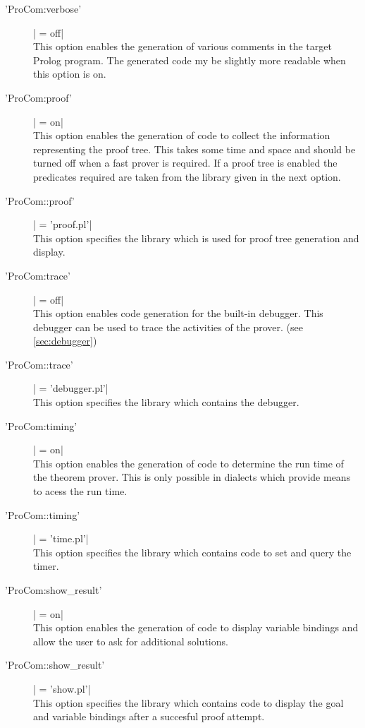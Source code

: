 \begin{description}

  \item ['ProCom:verbose'] | = off|
    \\
    This option enables the generation of various comments in the target
    Prolog program. The generated code my be slightly more readable when this
    option is on.

  \item ['ProCom:proof'] | = on|
    \\
    This option enables the generation of code to collect the information
    representing the proof tree. This takes some time and space and should be
    turned off when a fast prover is required. If a proof tree is enabled the
    predicates required are taken from the library given in the next option.

  \item ['ProCom::proof'] | = 'proof.pl'|
    \\
    This option specifies the library which is used for proof tree generation
    and display.

  \item ['ProCom:trace'	] | = off|
    \\
    This option enables code generation for the built-in debugger. This
    debugger can be used to trace the activities of the prover. (see
    \ref{sec:debugger})

  \item ['ProCom::trace'] | = 'debugger.pl'|
    \\
    This option specifies the library which contains the debugger.

  \item ['ProCom:timing'] | = on|
    \\
    This option enables the generation of code to determine the run time of
    the theorem prover. This is only possible in dialects which provide means
    to acess the run time.

  \item ['ProCom::timing'] | = 'time.pl'|
    \\
    This option specifies the library which contains code to set and query the
    timer.

  \item ['ProCom:show\_result'] | = on|
    \\
    This option enables the generation of code to display variable bindings
    and allow the user to ask for additional solutions.

  \item ['ProCom::show\_result'] | = 'show.pl'|
    \\
    This option specifies the library which contains code to display the goal
    and variable bindings after a succesful proof attempt.

\end{description}


